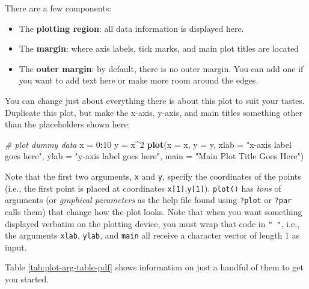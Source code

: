 \documentclass[]{book}
\newenvironment{Shaded}{\begin{snugshade}}{\end{snugshade}}
\newcommand{\KeywordTok}[1]{\textcolor[rgb]{0.13,0.29,0.53}{\textbf{#1}}}
\newcommand{\DataTypeTok}[1]{\textcolor[rgb]{0.13,0.29,0.53}{#1}}
\newcommand{\DecValTok}[1]{\textcolor[rgb]{0.00,0.00,0.81}{#1}}
\newcommand{\StringTok}[1]{\textcolor[rgb]{0.31,0.60,0.02}{#1}}
\newcommand{\CommentTok}[1]{\textcolor[rgb]{0.56,0.35,0.01}{\textit{#1}}}
\newcommand{\OperatorTok}[1]{\textcolor[rgb]{0.81,0.36,0.00}{\textbf{#1}}}
\newcommand{\NormalTok}[1]{#1}
\providecommand{\tightlist}{%
  \setlength{\itemsep}{0pt}\setlength{\parskip}{0pt}}
\theoremstyle{definition}
\theoremstyle{definition}
\theoremstyle{definition}
\theoremstyle{remark}
\begin{document}
There are a few components:

\begin{itemize}
\tightlist
\item
  The \textbf{plotting region}: all data information is displayed here.
\item
  The \textbf{margin}: where axis labels, tick marks, and main plot
  titles are located
\item
  The \textbf{outer margin}: by default, there is no outer margin. You
  can add one if you want to add text here or make more room around the
  edges.
\end{itemize}

You can change just about everything there is about this plot to suit
your tastes. Duplicate this plot, but make the x-axis, y-axis, and main
titles something other than the placeholders shown here:

\begin{Shaded}
\begin{Highlighting}[]
\CommentTok{# plot dummy data}
\NormalTok{x =}\StringTok{ }\DecValTok{0}\OperatorTok{:}\DecValTok{10}
\NormalTok{y =}\StringTok{ }\NormalTok{x}\OperatorTok{^}\DecValTok{2}
\KeywordTok{plot}\NormalTok{(}\DataTypeTok{x =}\NormalTok{ x, }\DataTypeTok{y =}\NormalTok{ y,}
     \DataTypeTok{xlab =} \StringTok{"x-axis label goes here"}\NormalTok{, }
     \DataTypeTok{ylab =} \StringTok{"y-axis label goes here"}\NormalTok{,}
     \DataTypeTok{main =} \StringTok{"Main Plot Title Goes Here"}\NormalTok{)}
\end{Highlighting}
\end{Shaded}

Note that the first two arguments, \texttt{x} and \texttt{y}, specify
the coordinates of the points (i.e., the first point is placed at
coordinates \texttt{x{[}1{]}},\texttt{y{[}1{]}}). \texttt{plot()} has
\emph{tons} of arguments (or \emph{graphical parameters} as the help
file found using \texttt{?plot} or \texttt{?par} calls them) that change
how the plot looks. Note that when you want something displayed verbatim
on the plotting device, you must wrap that code in \texttt{"\ "}, i.e.,
the arguments \texttt{xlab}, \texttt{ylab}, and \texttt{main} all
receive a character vector of length 1 as input.

Table \ref{tab:plot-arg-table-pdf} shows information on just a handful
of them to get you started.
\end{document}
